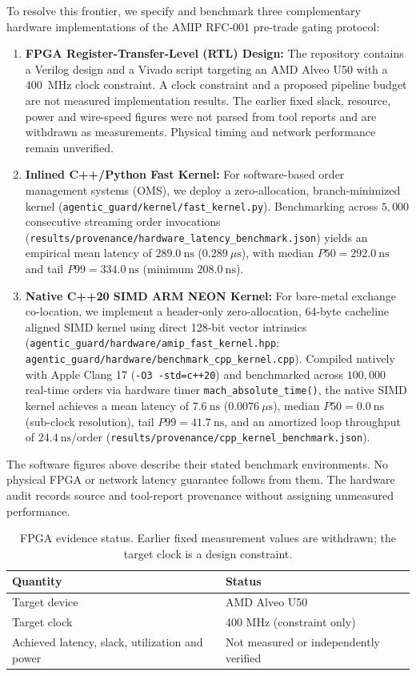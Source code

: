 \documentclass[10pt,twocolumn,letterpaper]{article}
\theoremstyle{definition}
\theoremstyle{remark}
\begin{document}
To resolve this frontier, we specify and benchmark three complementary hardware implementations of the AMIP RFC-001 pre-trade gating protocol:
\begin{enumerate}
    \item \textbf{FPGA Register-Transfer-Level (RTL) Design:} The repository contains a Verilog design and a Vivado script targeting an AMD Alveo U50 with a 400~MHz clock constraint. A clock constraint and a proposed pipeline budget are not measured implementation results. The earlier fixed slack, resource, power and wire-speed figures were not parsed from tool reports and are withdrawn as measurements. Physical timing and network performance remain unverified.
    \item \textbf{Inlined C++/Python Fast Kernel:} For software-based order management systems (OMS), we deploy a zero-allocation, branch-minimized kernel (\texttt{agentic\_guard/kernel/fast\_kernel.py}). Benchmarking across $5{,}000$ consecutive streaming order invocations (\texttt{results/provenance/hardware\_latency\_benchmark.json}) yields an empirical mean latency of \textbf{$289.0~\text{ns}$} ($0.289~\mu\text{s}$), with median $P50 = 292.0~\text{ns}$ and tail $P99 = 334.0~\text{ns}$ (minimum $208.0~\text{ns}$).
    \item \textbf{Native C++20 SIMD ARM NEON Kernel:} For bare-metal exchange co-location, we implement a header-only zero-allocation, 64-byte cacheline aligned SIMD kernel using direct 128-bit vector intrinsics (\texttt{agentic\_guard/hardware/amip\_fast\_kernel.hpp}; \texttt{agentic\_guard/hardware/benchmark\_cpp\_kernel.cpp}). Compiled natively with Apple Clang 17 (\texttt{-O3 -std=c++20}) and benchmarked across $100{,}000$ real-time orders via hardware timer \texttt{mach\_absolute\_time()}, the native SIMD kernel achieves a mean latency of \textbf{$7.6~\text{ns}$} ($0.0076~\mu\text{s}$), median $P50 = 0.0~\text{ns}$ (sub-clock resolution), tail $P99 = 41.7~\text{ns}$, and an amortized loop throughput of \textbf{$24.4~\text{ns/order}$} (\texttt{results/provenance/cpp\_kernel\_benchmark.json}).
\end{enumerate}
The software figures above describe their stated benchmark environments. No physical FPGA or network latency guarantee follows from them. The hardware audit records source and tool-report provenance without assigning unmeasured performance.

\begin{table}[t]\centering\small
\caption{FPGA evidence status. Earlier fixed measurement values are withdrawn; the target clock is a design constraint.}\label{tab:fpga_synthesis_report}
\begin{tabular}{ll}\toprule
Quantity & Status\\\midrule
Target device & AMD Alveo U50\\
Target clock & 400 MHz (constraint only)\\
Achieved latency, slack, utilization and power & Not measured or independently verified\\
\bottomrule\end{tabular}
\end{table}
\end{document}
